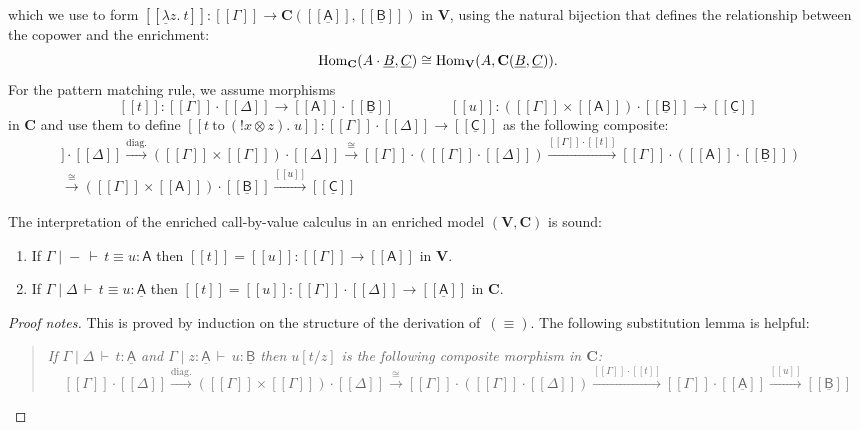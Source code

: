 \documentclass{LMCS}
\newcommand{\hide}[1]{}
\newenvironment{proofnotes}{\begin{proof}[Proof notes]}{\end{proof}}
\newcommand{\comptype}[1]{\underline{#1}}
\newcommand{\linlambda}{\comptype{\lambda}}
\newcommand{\co}{\colon}
\newcommand{\VA}{\mathsf{A}}
\newcommand{\CA}{\comptype{\mathsf{A}}}
\newcommand{\CB}{\comptype{\mathsf{B}}}
\newcommand{\CC}{\comptype{\mathsf{C}}}
\newcommand{\tensor}{\otimes}
\newcommand{\llambda}{\linlambda}
\newcommand{\llam}[3]{\llambda #1.\: #3}
\newcommand{\ltensorterm}[2]{{!  #1} \tensor #2}
\newcommand{\letdot}[4]{{#3}\:\mathrm{to}\:{(\ltensorterm{#1}{#2})}.\;#4}
\newcommand{\rIn}[2]{#1 \colon  #2}
\newcommand{\aj}[4]{#1 \mid  \! #2 \, \vdash \, \rIn{#3}{#4}}
\newcommand{\aeq}[5]{#1 \mid  \! #2 \, \vdash \, \rIn{#3\equiv #4}{#5}}
\newcommand{\tj}[3]{\aj{#1}{{-}}{#2}{#3}}
\newcommand{\teq}[4]{\aj{#1}{{-}}{#2\equiv #3}{#4}}
\newcommand{\VCat}{\fixedcatfont{V}} \newcommand{\CCat}{\fixedcatfont{C}} \newcommand{\DCat}{\fixedcatfont{D}}
\newcommand{\ltensor}[2]{#1 \cdot #2}
\newcommand{\fixedcatfont}{\mathbf}
\newcommand{\denlb}{[\![}
\newcommand{\denrb}{]\!]}
\newcommand{\den}[1]{\denlb{#1}\denrb}
\newcommand{\SA}{A}
\newcommand{\algB}{\underline{B}}
\newcommand{\algC}{\underline{C}}
\begin{document}
\begin{itemize}
which we use to form 
${\den{\llam z\CA t}: {\den\Gamma}\to \CCat(\den \CA,\den \CB)}$ 
in $\VCat$, using the natural bijection
that defines the relationship between the copower and the enrichment:
\[
\Homset{\CCat}{\ltensor{\SA}{\algB}}{\algC}\cong\Homset{\VCat}{\SA}{\CCat(\algB,\algC)}\text.
\]
For the pattern matching rule,
we assume morphisms 
\[\den t:\ltensor{\den\Gamma}{\den\Delta}\to \ltensor {\den \VA}{\den \CB}
\qquad\qquad
\den u:\ltensor{(\den\Gamma\times \den\VA)}{\den\CB}\to {\den \CC}\]
in $\CCat$ and use them to 
define $\den {\letdot x z t u}:\ltensor{\den\Gamma}{\den\Delta}\to\den{\CC}$
as the following composite:
\begin{align*}
\ltensor{\den\Gamma}{ \den\Delta}
\xrightarrow{\text{diag.}}
\ltensor{(\den\Gamma\times \den \Gamma)}{ \den\Delta}
\xrightarrow{\cong}
\ltensor{\den\Gamma}{(\ltensor{\den \Gamma} {\den\Delta})}
\xrightarrow {\ltensor {\den \Gamma}{ \den t}}
\ltensor{\den\Gamma}{(\ltensor{\den \VA} {\den\CB})}\quad
\\\xrightarrow{\cong}
\ltensor{(\den\Gamma\times \den \VA)}{ \den\CB}
\xrightarrow{\den u}
\den \CC
\end{align*}
\end{itemize}

\begin{prop}
The interpretation of the enriched call-by-value calculus 
in an enriched model 
$(\VCat,\CCat)$ is sound:
\begin{enumerate}
\item If $\teq \Gamma t u \VA$ then 
$\den t=\den u:\den \Gamma\to\den \VA$
in $\VCat$.
\item If $\aeq \Gamma \Delta t u \CA$ then 
$\den t=\den u:\ltensor{\den \Gamma}{\den\Delta}
\to\den \CA$
in $\CCat$.
\end{enumerate}
\end{prop}
\begin{proofnotes}
This is proved by induction on the structure of the 
derivation of~$(\equiv)$.
The following substitution lemma is helpful:
\hide{\item If $\tj \Gamma t \VA$ and $\aj {\Gamma,x\co\VA,\Gamma'}{\Delta} u \CB$ 
then $u[t/x]$ is the following composite  in $\VCat$:
\[
\ltensor{(\den\Gamma\times \den {\Gamma'})}{\den\Delta}
\xrightarrow{\text{diag.}}
\ltensor{(\den\Gamma\times\den\Gamma\times\den {\Gamma'})}{\den\Delta}
\xrightarrow{(\ltensor{\den\Gamma\times \den t\times \den {\Gamma'})}{\den\Delta}}
{\ltensor{(\den\Gamma\times \den\VA\times\den{\Gamma'})}{\den\Delta}}
\xrightarrow{\den u}
{\den \CB}
\]
}
\begin{quote}
\emph{If $\aj \Gamma \Delta t \CA$ and $\aj \Gamma{z\co \CA} u \CB$ 
then $u[t/z]$ is the following composite morphism in $\CCat$:}
\[
\ltensor{\den\Gamma}{\den\Delta}
\xrightarrow{\text{diag.}}
\ltensor{(\den\Gamma\times \den\Gamma)}{\den\Delta}
\xrightarrow{\cong}
{\ltensor{\den\Gamma}{(\ltensor{\den\Gamma}{\den\Delta})}}
\xrightarrow{\ltensor{\den\Gamma}{\den t}}
\ltensor{\den\Gamma}{\den \CA}
\xrightarrow{\den u}
{\den \CB}
\]
\end{quote}\vspace{-1.367\baselineskip}
\end{proofnotes}
\end{document}
